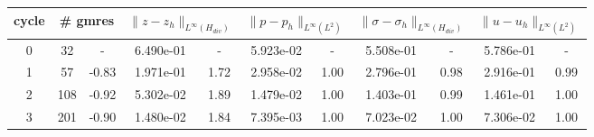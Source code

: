 \documentclass[10pt]{report}
\begin{document}
\begin{table}[H]
\begin{center}
\begin{tabular}{|c|c|c|c|c|c|c|c|c|c|c|} \hline
cycle & 
\multicolumn{2}{|c|}{\# gmres} & 
\multicolumn{2}{|c|}{$ \|z - z_h\|_{L^{\infty}(H_{div})} $} & 
\multicolumn{2}{|c|}{$ \|p - p_h\|_{L^{\infty}(L^2)} $} & 
\multicolumn{2}{|c|}{$ \|\sigma - \sigma_h\|_{L^{\infty}(H_{div})} $} & 
\multicolumn{2}{|c|}{$ \|u - u_h\|_{L^{\infty}(L^2)} $}\\ \hline
0 & 32 & - & 6.490e-01 & - & 5.923e-02 & - & 5.508e-01 & - & 5.786e-01 & -\\ \hline
1 & 57 & -0.83 & 1.971e-01 & 1.72 & 2.958e-02 & 1.00 & 2.796e-01 & 0.98 & 2.916e-01 & 0.99\\ \hline
2 & 108 & -0.92 & 5.302e-02 & 1.89 & 1.479e-02 & 1.00 & 1.403e-01 & 0.99 & 1.461e-01 & 1.00\\ \hline
3 & 201 & -0.90 & 1.480e-02 & 1.84 & 7.395e-03 & 1.00 & 7.023e-02 & 1.00 & 7.306e-02 & 1.00\\ \hline
\end{tabular}
\end{center}
\end{table}
\end{document}
